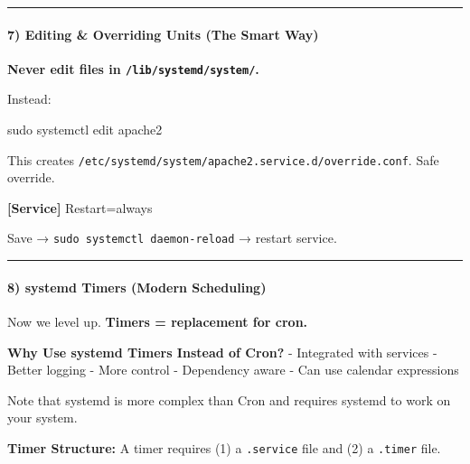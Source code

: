 \documentclass[
  english,
  paper=a4,
  oneside  ,captions=tableheading
]{scrartcl}
\newenvironment{Shaded}{}{}
\newcommand{\DataTypeTok}[1]{\textcolor[rgb]{0.56,0.13,0.00}{#1}}
\newcommand{\FunctionTok}[1]{\textcolor[rgb]{0.02,0.16,0.49}{#1}}
\newcommand{\KeywordTok}[1]{\textcolor[rgb]{0.00,0.44,0.13}{\textbf{#1}}}
\newcommand{\NormalTok}[1]{#1}
\newcommand{\OtherTok}[1]{\textcolor[rgb]{0.00,0.44,0.13}{#1}}
\newcommand{\StringTok}[1]{\textcolor[rgb]{0.25,0.44,0.63}{#1}}
\renewenvironment{quote}{\begin{customblockquote}\list{}{\rightmargin=0em\leftmargin=0em}%
\item\relax\color{blockquote-text}\ignorespaces}{\unskip\unskip\endlist\end{customblockquote}}
\begin{document}
\begin{center}\rule{0.5\linewidth}{0.5pt}\end{center}

\paragraph{7) Editing \& Overriding Units (The Smart
Way)}\label{editing-overriding-units-the-smart-way}

\textbf{Never edit files in \texttt{/lib/systemd/system/}.}

Instead:

\begin{Shaded}
\begin{Highlighting}[]
\FunctionTok{sudo}\NormalTok{ systemctl edit apache2}
\end{Highlighting}
\end{Shaded}

This creates
\texttt{/etc/systemd/system/apache2.service.d/override.conf}. Safe
override.

\begin{Shaded}
\begin{Highlighting}[]
\KeywordTok{[Service]}
\DataTypeTok{Restart}\OtherTok{=}\StringTok{always}
\end{Highlighting}
\end{Shaded}

Save → \texttt{sudo\ systemctl\ daemon-reload} → restart service.

\begin{center}\rule{0.5\linewidth}{0.5pt}\end{center}

\paragraph{8) systemd Timers (Modern
Scheduling)}\label{systemd-timers-modern-scheduling}

Now we level up. \textbf{Timers = replacement for cron.}

\textbf{Why Use systemd Timers Instead of Cron?} - Integrated with
services - Better logging - More control - Dependency aware - Can use
calendar expressions

\begin{quote}
Note that systemd is more complex than Cron and requires systemd to work
on your system.
\end{quote}

\textbf{Timer Structure:} A timer requires (1) a \texttt{.service} file
and (2) a \texttt{.timer} file.
\end{document}

